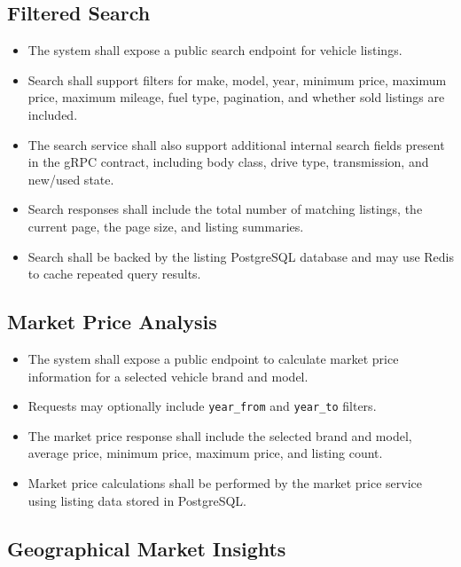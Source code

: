\subsection{Filtered Search}

\begin{itemize}
    \item The system shall expose a public search endpoint for vehicle listings.
    \item Search shall support filters for make, model, year, minimum price, maximum price, maximum mileage, fuel type, pagination, and whether sold listings are included.
    \item The search service shall also support additional internal search fields present in the gRPC contract, including body class, drive type, transmission, and new/used state.
    \item Search responses shall include the total number of matching listings, the current page, the page size, and listing summaries.
    \item Search shall be backed by the listing PostgreSQL database and may use Redis to cache repeated query results.
\end{itemize}

\subsection{Market Price Analysis}

\begin{itemize}
    \item The system shall expose a public endpoint to calculate market price information for a selected vehicle brand and model.
    \item Requests may optionally include \texttt{year\_from} and \texttt{year\_to} filters.
    \item The market price response shall include the selected brand and model, average price, minimum price, maximum price, and listing count.
    \item Market price calculations shall be performed by the market price service using listing data stored in PostgreSQL.
\end{itemize}

\subsection{Geographical Market Insights}

